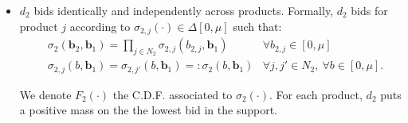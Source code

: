 \documentclass[11pt]{article}
\theoremstyle{plain}
\theoremstyle{definition}
\theoremstyle{plain}
\theoremstyle{plain}
\theoremstyle{plain}
\theoremstyle{plain}
\numberwithin{equation}{section}
\begin{document}
\begin{itemize}
    \noindent We denote $ F_1^{v_H} (b) $ the C.D.F. associated to the distribution $ \sigma_1 (b\ | \ v_H) $. When $t_{1,\iota} = \mu$ for all $\iota \in N_1$ on the other hand, $ d_1 $ bids for product $ \iota $ according to $ \sigma_{1,\iota}(\cdot) \in \Delta[0,\mu] $ such that:

    \vspace{-0.4cm}

    \begin{align*}
    &\sigma_1 (\bm{b}_1 \ |\ t_{1,\iota} = \mu, \ \forall \iota) = \prod_{\iota \in N_1} \sigma_{1,\iota} (b_{1,\iota} \ | \ t_{1,\iota} = \mu ) & \forall b_{1,\iota} \in [0,\mu] \\[5pt]
    &\sigma_{1,\iota} (b \ | \ t_{1,\iota} = \mu) = \sigma_{1,\iota'} (b \ | \ t_{1,\iota'} = \mu) =: \sigma_1 (b \ | \ \mu) & \forall \iota, \iota' \in N_1, \ \forall b \in [0,\mu].
    \end{align*}

    \noindent We denote $ F_1^{\mu} (b) $ the C.D.F. associated to the distribution $ \sigma_1 (b \ | \ \mu) $.

    \vspace{0.4cm}

    \item $ d_2 $ bids identically and independently across products. Formally, $ d_2 $ bids for product $ j $ according to $ \sigma_{2,j}(\cdot) \in \Delta[0,\mu] $ such that:
    \begin{align*}
    &\sigma_2 (\bm{b}_2, \bm{b}_1) = \prod_{j \in N_2} \sigma_{2,j} (b_{2,j}, \bm{b}_1 ) & \forall b_{2,j} \in [0,\mu] \\[5pt]
    &\sigma_{2,j} (b, \bm{b}_1) = \sigma_{2,j'} (b, \bm{b}_1) =: \sigma_2 (b, \bm{b}_1) & \forall j, j' \in N_2, \ \forall b \in [0,\mu].
    \end{align*}

    \noindent We denote $ F_2 (\cdot) $ the C.D.F. associated to $ \sigma_2 (\cdot) $. For each product, $ d_2 $ puts a positive mass on the the lowest bid in the support.
\end{itemize}
\vspace{4mm}
\end{document}
